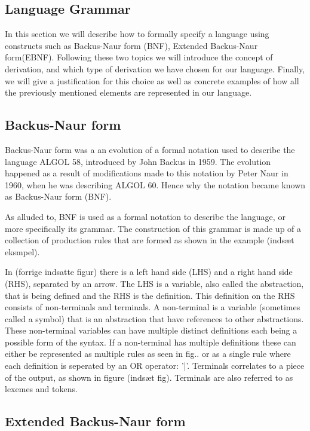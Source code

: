 \subsection{Language Grammar} \label{langGram}

In this section we will describe how to formally specify a language using constructs such as Backus-Naur form (BNF), Extended Backus-Naur form(EBNF).
Following these two topics we will introduce the concept of derivation, and which type of derivation we have chosen for our language. 
Finally, we will give a justification for this choice as well as concrete examples of how all the previously mentioned elements are represented in our language.

\subsection{Backus-Naur form}

Backus-Naur form was a an evolution of a formal notation used to describe the language ALGOL 58, introduced by John Backus in 1959. The evolution happened as a result of modifications
made to this notation by Peter Naur in 1960, when he was describing ALGOL 60. Hence why the notation became known as Backus-Naur form (BNF)\cite{sebesta_concepts_2016}. 

As alluded to, BNF is used as a formal notation to describe the language, or more specifically its grammar. The construction of this grammar is made up of a collection of production rules that are formed as shown in the example (indsæt eksmpel).

In (forrige indsatte figur) there is a left hand side (LHS) and a right hand side (RHS), separated by an arrow. The LHS is a variable, also called the abstraction, that is being defined and the RHS is the definition.
This definition on the RHS consists of non-terminals and terminals. A non-terminal is a variable (sometimes called a symbol) that is an abstraction that have references to other abstractions. 
These non-terminal variables can have multiple distinct definitions each being a possible form of the syntax. If a non-terminal has multiple definitions these can either be represented as multiple 
rules as seen in fig.. or as a single rule where each definition is seperated by an OR operator: '|'. Terminals correlates to a piece of the output, as shown in figure (indsæt fig). 
Terminals are also referred to as lexemes and tokens\cite{sebesta_concepts_2016}. 

\subsection{Extended Backus-Naur form}

